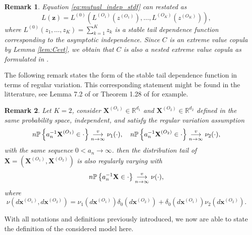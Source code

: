 \documentclass[11pt]{article}
\newtheorem{remark}{Remark}
\begin{document}
	\begin{remark}
		Equation \eqref{eq:mutual_indep_stdf} can restated as 
		\begin{equation*}
			L(\textbf{z}) = L^{(0)} \left(L^{(O_1)}\left(z^{(O_1)}\right), \dots, L^{(O_K)}\left(z^{(O_K)}\right) \right),
		\end{equation*}
		where $L^{(0)}(z_1, \dots, z_K) = \sum_{k=1}^K z_k$ is a \emph{stable tail dependence function} corresponding to the asymptotic independence. Since $C$ is an extreme value copula by Lemma \ref{lem:Cevt}, we obtain that $C$ is also a nested extreme value copula as formulated in \cite{hofert2018hierarchical}.
	\end{remark}
	The following remark states the form of the stable tail dependence function in terms of regular variation. This corresponding statement might be found in the litterature, see Lemma 7.2 of \cite{resnick2007heavy} or Theorem 1.28 of \cite{lindskog2004multivariate} for example.	
	\begin{remark}
		Let $K = 2$, consider $\textbf{X}^{(O_1)} \in \mathbb{R}^{d_1}$ and $\textbf{X}^{(O_2)} \in \mathbb{R}^{d_2}$ defined in the same probability space, independent, and satisfy the regular variation assumption
		\begin{equation*}
			n \mathbb{P}\left\{ a_n^{-1} \textbf{X}^{(O_1)} \in \cdot \right\} \overunderset{v}{n \rightarrow \infty}{\longrightarrow} \nu_1(\cdot), \quad n \mathbb{P}\left\{ a_n^{-1} \textbf{X}^{(O_2)} \in \cdot \right\} \overunderset{v}{n \rightarrow \infty}{\longrightarrow} \nu_2(\cdot),
		\end{equation*}
		with the same sequence $0< a_n \rightarrow \infty$. then the distribution tail of $\textbf{X} = (\textbf{X}^{(O_1)}, \textbf{X}^{(O_2)})$ is also regularly varying with 
		\begin{equation*}
			n \mathbb{P}\left\{ a_n^{-1} \textbf{X} \in \cdot \right\} \overunderset{v}{n \rightarrow \infty}{\longrightarrow} \nu(\cdot),
		\end{equation*}
		where
		\begin{equation*}
			\nu(d\textbf{x}^{(O_1)}, d\textbf{x}^{(O_2)}) = \nu_1 (d\textbf{x}^{(O_1)}) \delta_0(d\textbf{x}^{(O_2)}) + \delta_0(d\textbf{x}^{(O_1)}) \nu_2(d\textbf{x}^{(O_2)}).
		\end{equation*}
	\end{remark}
	
	With all notations and definitions previously introduced, we now are able to state the definition of the considered model here.
	
\end{document}
